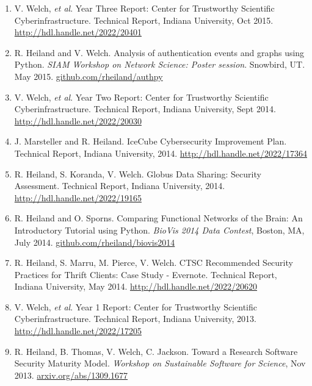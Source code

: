 \documentclass[letterpaper,11pt]{article}
\begin{document}
\begin{enumerate}
	\item
	V. Welch, {\em et al}.
	Year Three Report: Center for Trustworthy Scientific Cyberinfrastructure.
	Technical Report, Indiana University,  Oct 2015.
	\hyperref{http://hdl.handle.net/2022/20401}{}{}{http://hdl.handle.net/2022/20401}
	
	\item
	R. Heiland and V. Welch.
	Analysis of authentication events and graphs using Python.
	\textit{SIAM Workshop on Network Science: Poster session}. Snowbird, UT. May 2015.
	\hyperref{https://github.com/rheiland/authpy}{}{}{github.com/rheiland/authpy}
	
		\item
	V. Welch, {\em et al}.
	Year Two Report: Center for Trustworthy Scientific Cyberinfrastructure.
	Technical Report, Indiana University,  Sept 2014.
	\hyperref{http://hdl.handle.net/2022/20030}{}{}{http://hdl.handle.net/2022/20030}
	
	\item
	J. Marsteller and R. Heiland.
	IceCube Cybersecurity Improvement Plan.
	Technical Report, Indiana University, 2014.
	\hyperref{http://hdl.handle.net/2022/17364}{}{}{http://hdl.handle.net/2022/17364}
	
	\item
	R. Heiland, S. Koranda, V. Welch.
	Globus Data Sharing: Security Assessment.
	Technical Report, Indiana University, 2014.
	\hyperref{http://hdl.handle.net/2022/19165}{}{}{http://hdl.handle.net/2022/19165}
	
	\item
	R. Heiland and O. Sporns.
	Comparing Functional Networks of the Brain: An Introductory Tutorial using Python.
	\textit{BioVis 2014 Data Contest}, Boston, MA, July 2014. 
	\hyperref{https://github.com/rheiland/biovis2014}{}{}{github.com/rheiland/biovis2014}
	
	\item
	R. Heiland, S. Marru, M. Pierce, V. Welch.
	CTSC Recommended Security Practices for Thrift Clients: Case Study - Evernote.
	Technical Report, Indiana University, May 2014. 
	\hyperref{http://hdl.handle.net/2022/20620}{}{}{http://hdl.handle.net/2022/20620}
	
	\item
	V. Welch, {\em et al}.
	Year 1 Report: Center for Trustworthy Scientific Cyberinfrastructure.
	Technical Report, Indiana University,  2013.
	\hyperref{http://hdl.handle.net/2022/17205}{}{}{http://hdl.handle.net/2022/17205}
	
	\item
	R. Heiland, B. Thomas, V. Welch, C. Jackson.
	Toward a Research Software Security Maturity Model.
	\textit{Workshop on Sustainable Software for Science}, Nov 2013.
	\hyperref{https://arxiv.org/abs/1309.1677}{}{}{arxiv.org/abs/1309.1677}


\end{enumerate}
\end{document}
